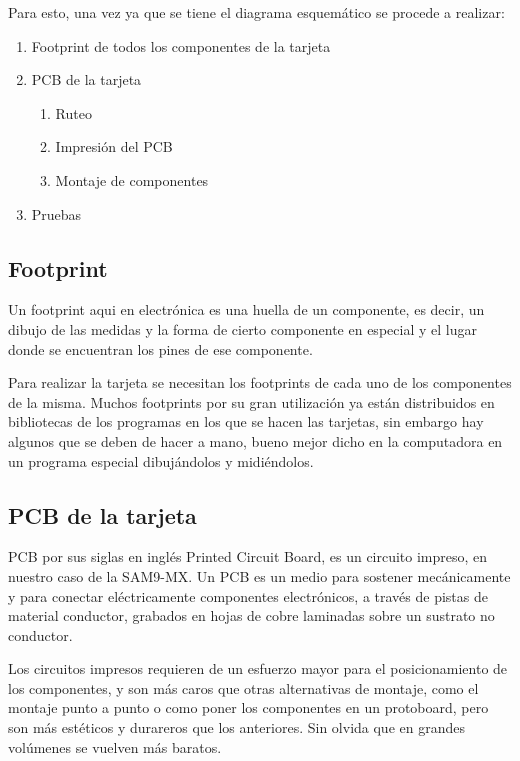 Para esto, una vez ya que se tiene el diagrama esquem\'atico se procede a realizar:

\begin{enumerate}

\item Footprint de todos los componentes de la tarjeta
\item PCB de la tarjeta

\begin{enumerate}
\item Ruteo
\item Impresi\'on del PCB
\item Montaje de componentes
\end{enumerate}

\item Pruebas

\end{enumerate} 

\subsection{Footprint}

Un footprint aqui en electr\'onica es una huella de un componente, es decir, un dibujo de las medidas y la forma de cierto componente en especial y el lugar donde se encuentran los pines de ese componente.\medskip

Para realizar la tarjeta se necesitan los footprints de cada uno de los componentes de la misma. Muchos footprints por su gran utilizaci\'on ya est\'an distribuidos en bibliotecas de los programas en los que se hacen las tarjetas, sin embargo hay algunos que se deben de hacer a mano, bueno mejor dicho en la computadora en un programa especial dibuj\'andolos y midi\'endolos.\medskip

\subsection{PCB de la tarjeta}\medskip 

PCB por sus siglas en ingl\'es Printed Circuit Board, es un circuito impreso, en nuestro caso de la SAM9-MX. Un PCB es un medio para sostener mec\'anicamente y para conectar el\'ectricamente componentes electr\'onicos, a trav\'es de pistas de material conductor, grabados en hojas de cobre laminadas sobre un sustrato no conductor.\medskip

Los circuitos impresos requieren de un esfuerzo mayor para el posicionamiento de los componentes, y son m\'as caros que otras alternativas de montaje, como el montaje punto a punto o como poner los componentes en un protoboard, pero son m\'as est\'eticos y durareros que los anteriores. Sin olvida que en grandes vol\'umenes se vuelven m\'as baratos.\medskip


